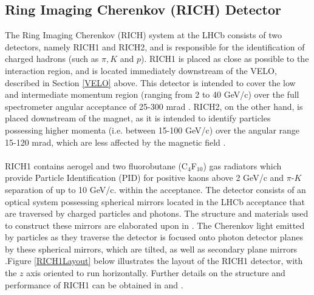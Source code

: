 \subsection{Ring Imaging Cherenkov (RICH) Detector}
The Ring Imaging Cherenkov (RICH) system at the LHCb consists of two detectors, namely RICH1 and RICH2, and is responsible for the identification of charged hadrons (such as $\pi, K$ and $p$). RICH1 is placed as close as possible to the interaction region, and is located immediately downstream of the VELO, described in Section \ref{VELO} above. This detector is intended to cover the low and intermediate momentum region (ranging from 2 to 40 GeV/c) over the full spectrometer angular acceptance of 25-300 mrad \cite{Adinolfi_2013}. RICH2, on the other hand, is placed downstream of the magnet, as it is intended to
identify particles possessing higher momenta (i.e. between 15-100 GeV/c) over the angular range 15-120 mrad, which are less affected by the magnetic field \cite{Adinolfi_2013}.\\
\\
RICH1 contains aerogel and two fluorobutane (C$_{4}$F$_{10}$) gas radiators which provide Particle Identification (PID) for positive kaons above 2 GeV/c and $\pi$-$K$ separation of up to 10 GeV/c.  within the acceptance. The detector consists of an optical system possessing spherical mirrors located in the LHCb acceptance that are traversed by charged particles and photons. The structure and materials used to construct these mirrors are elaborated upon in \cite{Antunes-Nobrega:630827}. The Cherenkov light emitted by particles as they traverse the detector is focused onto photon detector planes by these spherical mirrors, which are tilted, as well as secondary plane mirrors \cite{Antunes-Nobrega:630827}.Figure 
\ref{RICH1Layout} below illustrates the layout of the RICH1 detector, with the $z$ axis oriented to run horizontally. 
Further details on the structure and performance of RICH1 can be obtained in \cite{Adinolfi_2013} and \cite{Antunes-Nobrega:630827}. 
